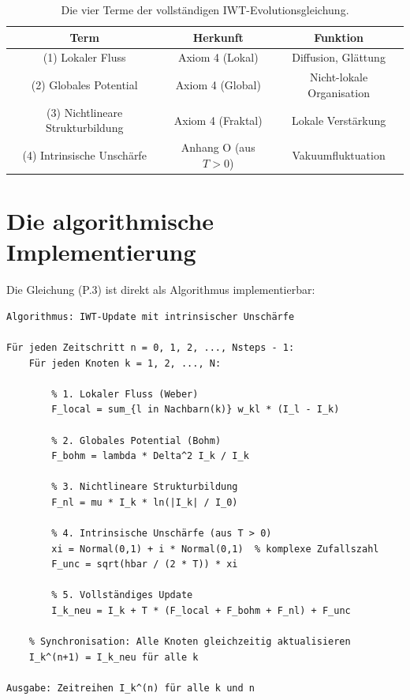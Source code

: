 \begin{table}[htbp]
\centering
\small
\begin{tabular}{c|c|c}
\hline
\textbf{Term} & \textbf{Herkunft} & \textbf{Funktion} \\
\hline
(1) Lokaler Fluss & Axiom 4 (Lokal) & Diffusion, Glättung \\
(2) Globales Potential & Axiom 4 (Global) & Nicht-lokale Organisation \\
(3) Nichtlineare Strukturbildung & Axiom 4 (Fraktal) & Lokale Verstärkung \\
(4) Intrinsische Unschärfe & Anhang O (aus \( T > 0 \)) & Vakuumfluktuation \\
\hline
\end{tabular}
\caption{Die vier Terme der vollständigen IWT-Evolutionsgleichung.}
\label{tab:iwt_terme}
\end{table}

\section{Die algorithmische Implementierung}
\label{app:iwt_eq_implementierung}

Die Gleichung (P.3) ist direkt als Algorithmus implementierbar:

\begin{verbatim}
Algorithmus: IWT-Update mit intrinsischer Unschärfe

Für jeden Zeitschritt n = 0, 1, 2, ..., Nsteps - 1:
    Für jeden Knoten k = 1, 2, ..., N:
        
        % 1. Lokaler Fluss (Weber)
        F_local = sum_{l in Nachbarn(k)} w_kl * (I_l - I_k)
        
        % 2. Globales Potential (Bohm)
        F_bohm = lambda * Delta^2 I_k / I_k
        
        % 3. Nichtlineare Strukturbildung
        F_nl = mu * I_k * ln(|I_k| / I_0)
        
        % 4. Intrinsische Unschärfe (aus T > 0)
        xi = Normal(0,1) + i * Normal(0,1)  % komplexe Zufallszahl
        F_unc = sqrt(hbar / (2 * T)) * xi
        
        % 5. Vollständiges Update
        I_k_neu = I_k + T * (F_local + F_bohm + F_nl) + F_unc
    
    % Synchronisation: Alle Knoten gleichzeitig aktualisieren
    I_k^(n+1) = I_k_neu für alle k

Ausgabe: Zeitreihen I_k^(n) für alle k und n
\end{verbatim}

